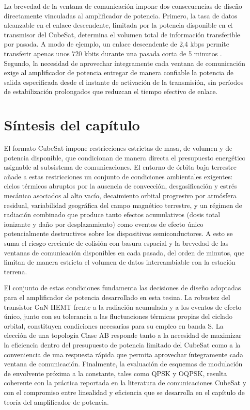 La brevedad de la ventana de comunicación impone dos consecuencias de diseño directamente vinculadas al amplificador de potencia. Primero, la tasa de datos alcanzable en el enlace descendente, limitada por la potencia disponible en el transmisor del CubeSat, determina el volumen total de información transferible por pasada. A modo de ejemplo, un enlace descendente de 2,4 kbps permite transferir apenas unos 720 kbits durante una pasada corta de 5 minutos \cite{popescu2017}. Segundo, la necesidad de aprovechar íntegramente cada ventana de comunicación exige al amplificador de potencia entregar de manera confiable la potencia de salida especificada desde el instante de activación de la transmisión, sin períodos de estabilización prolongados que reduzcan el tiempo efectivo de enlace.

\section{Síntesis del capítulo}
El formato CubeSat impone restricciones estrictas de masa, de volumen y de potencia disponible, que condicionan de manera directa el presupuesto energético asignable al subsistema de comunicaciones. El entorno de órbita baja terrestre añade a estas restricciones un conjunto de condiciones ambientales exigentes: ciclos térmicos abruptos por la ausencia de convección, desgasificación y estrés mecánico asociados al alto vacío, decaimiento orbital progresivo por atmósfera residual, variabilidad geográfica del campo magnético terrestre, y un régimen de radiación combinado que produce tanto efectos acumulativos (dosis total ionizante y daño por desplazamiento) como eventos de efecto único potencialmente destructivos sobre los dispositivos semiconductores. A esto se suma el riesgo creciente de colisión con basura espacial y la brevedad de las ventanas de comunicación disponibles en cada pasada, del orden de minutos, que limitan de manera estricta el volumen de datos intercambiable con la estación terrena.

El conjunto de estas condiciones fundamenta las decisiones de diseño adoptadas para el amplificador de potencia desarrollado en esta tesina. La robustez del transistor GaN HEMT frente a la radiación acumulada y a los eventos de efecto único, junto con su tolerancia a las fluctuaciones térmicas propias del ciclado orbital, constituyen condiciones necesarias para su empleo en banda S. La elección de una topología Clase AB responde tanto a la necesidad de maximizar la eficiencia dentro del presupuesto de potencia limitado del CubeSat como a la conveniencia de una respuesta rápida que permita aprovechar íntegramente cada ventana de comunicación. Finalmente, la evaluación de esquemas de modulación de envolvente próxima a la constante, tales como QPSK y OQPSK, resulta coherente con la práctica reportada en la literatura de comunicaciones CubeSat y con el compromiso entre linealidad y eficiencia que se desarrolla en el capítulo de teoría del amplificador de potencia.